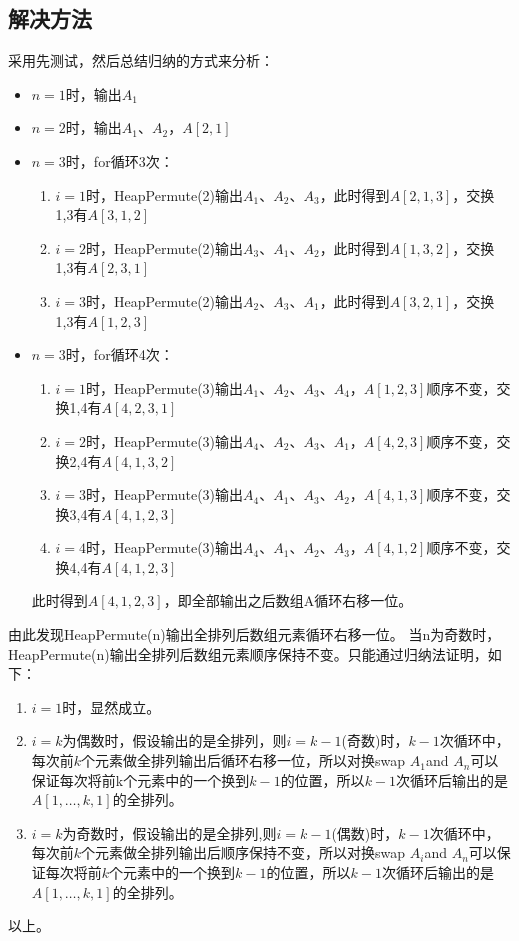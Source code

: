 \documentclass[cs4size, punct, nospace, fancyhdr, fntef, UTF8]{ctexart}
\begin{document}
  \subsection{解决方法}
  采用先测试，然后总结归纳的方式来分析：
  \begin{itemize}
    \item $n=1$时，输出$A_{1}$
    \item $n=2$时，输出$A_{1}$、$A_{2}$，$A[2,1]$
    \item $n=3$时，for循环3次：
    \begin{enumerate}
      \item $i=1$时，HeapPermute(2)输出$A_{1}$、$A_{2}$、$A_{3}$，此时得到$A[2,1,3]$，交换1,3有$A[3,1,2]$
      \item $i=2$时，HeapPermute(2)输出$A_{3}$、$A_{1}$、$A_{2}$，此时得到$A[1,3,2]$，交换1,3有$A[2,3,1]$
      \item $i=3$时，HeapPermute(2)输出$A_{2}$、$A_{3}$、$A_{1}$，此时得到$A[3,2,1]$，交换1,3有$A[1,2,3]$
    \end{enumerate}
    \item $n=3$时，for循环4次：
    \begin{enumerate}
      \item $i=1$时，HeapPermute(3)输出$A_{1}$、$A_{2}$、$A_{3}$、$A_{4}$，$A[1,2,3]$顺序不变，交换1,4有$A[4,2,3,1]$
      \item $i=2$时，HeapPermute(3)输出$A_{4}$、$A_{2}$、$A_{3}$、$A_{1}$，$A[4,2,3]$顺序不变，交换2,4有$A[4,1,3,2]$
      \item $i=3$时，HeapPermute(3)输出$A_{4}$、$A_{1}$、$A_{3}$、$A_{2}$，$A[4,1,3]$顺序不变，交换3,4有$A[4,1,2,3]$
      \item $i=4$时，HeapPermute(3)输出$A_{4}$、$A_{1}$、$A_{2}$、$A_{3}$，$A[4,1,2]$顺序不变，交换4,4有$A[4,1,2,3]$
    \end{enumerate}
    此时得到$A[4,1,2,3]$，即全部输出之后数组A循环右移一位。
  \end{itemize}
  由此发现HeapPermute(n)输出全排列后数组元素循环右移一位。 当n为奇数时，HeapPermute(n)输出全排列后数组元素顺序保持不变。只能通过归纳法证明，如下：
  \begin{enumerate}
    \item $i=1$时，显然成立。
    \item $i=k$为偶数时，假设输出的是全排列，则$i=k-1$(奇数)时，$k-1$次循环中，每次前$k$个元素做全排列输出后循环右移一位，所以对换swap $A_1$and $A_n$可以保证每次将前k个元素中的一个换到$k-1$的位置，所以$k-1$次循环后输出的是$A[1,\dots ,k,1]$的全排列。
    \item $i=k$为奇数时，假设输出的是全排列,则$i=k-1$(偶数)时，$k-1$次循环中，每次前$k$个元素做全排列输出后顺序保持不变，所以对换swap $A_i$and $A_n$可以保证每次将前$k$个元素中的一个换到$k-1$的位置，所以$k-1$次循环后输出的是$A[1,\dots ,k,1]$的全排列。
  \end{enumerate}
  以上。
\end{document}
